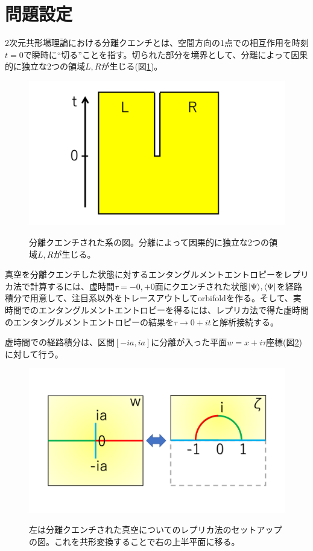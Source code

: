 \section{問題設定}\label{sec:SPQsetup}
2次元共形場理論における分離クエンチとは、空間方向の1点での相互作用を時刻$t=0$で瞬時に``切る''ことを指す。切られた部分を境界として、分離によって因果的に独立な2つの領域$L,R$が生じる(図\ref{fig:sqlorentz})。
\begin{figure}[h]
	\centering
	\includegraphics[width=0.7\linewidth]{SQlorentz.pdf}
	\label{fig:sqlorentz}
	\caption{分離クエンチされた系の図。分離によって因果的に独立な2つの領域$L,R$が生じる。}
\end{figure}

真空を分離クエンチした状態に対するエンタングルメントエントロピーをレプリカ法で計算するには、虚時間$\tau=-0,+0$面にクエンチされた状態$|\Psi\rangle, \langle\Psi|$を経路積分で用意して、注目系以外をトレースアウトしてorbifoldを作る。そして、実時間でのエンタングルメントエントロピーを得るには、レプリカ法で得た虚時間のエンタングルメントエントロピーの結果を$\tau\to 0+it$と解析接続する。

虚時間での経路積分は、区間$[-ia,ia]$に分離が入った平面$w=x+i\tau$座標(図\ref{fig:sqmapping})に対して行う。
\begin{figure}[h]
	\centering
	\includegraphics[width=0.7\linewidth]{SQmapping.pdf}
	\label{fig:sqmapping}
	\caption{左は分離クエンチされた真空についてのレプリカ法のセットアップの図。これを共形変換することで右の上半平面に移る。}
\end{figure}

